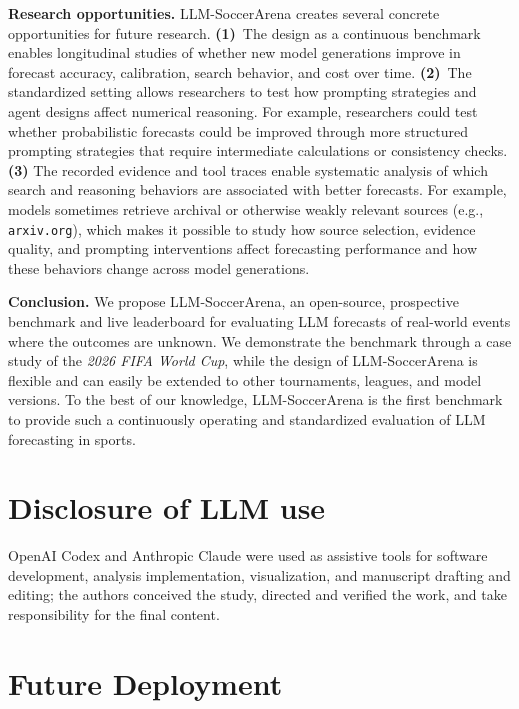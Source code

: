 \documentclass[sigconf,nonacm]{acmart}
\newcommand{\arena}{\mbox{LLM-SoccerArena}\xspace}
\begin{document}
\textbf{Research opportunities.}
\arena creates several concrete opportunities for future research. \textbf{(1)}~The design as a continuous benchmark enables longitudinal studies of whether new model generations improve in forecast accuracy, calibration, search behavior, and cost over time. \textbf{(2)}~The standardized setting allows researchers to test how prompting strategies and agent designs affect numerical reasoning. For example, researchers could test whether probabilistic forecasts could be improved through more structured prompting strategies that require intermediate calculations or consistency checks. \textbf{(3)} The recorded evidence and tool traces enable systematic analysis of which search and reasoning behaviors are associated with better forecasts. For example, models sometimes retrieve archival or otherwise weakly relevant sources (e.g., \texttt{arxiv.org}), which makes it possible to study how source selection, evidence quality, and prompting interventions affect forecasting performance and how these behaviors change across model generations.

\textbf{Conclusion.}
We propose \arena, an open-source, prospective benchmark and live leaderboard for evaluating LLM forecasts of real-world events where the outcomes are unknown. We demonstrate the benchmark through a case study of the \emph{2026 FIFA World Cup}, while the design of \arena is flexible and can easily be extended to other tournaments, leagues, and model versions. To the best of our knowledge, \arena is the first benchmark to provide such a continuously operating and standardized evaluation of LLM forecasting in sports.

\clearpage


\clearpage


\appendix

\section*{Disclosure of LLM use}

OpenAI Codex and Anthropic Claude were used as assistive tools for software development, analysis
implementation, visualization, and manuscript drafting and editing; the authors conceived the study,
directed and verified the work, and take responsibility for the final content.


\section{Future Deployment}
\end{document}
